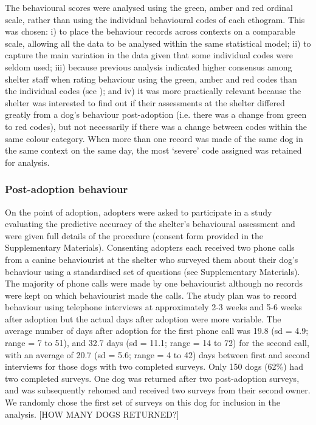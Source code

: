 \documentclass[12pt]{article}
\begin{document}
The behavioural scores were analysed using the green, amber and red ordinal scale, rather than using the individual behavioural codes of each ethogram. This was chosen: i) to place the behaviour records across contexts on a comparable scale, allowing all the data to be analysed within the same statistical model; ii) to capture the main variation in the data given that some individual codes were seldom used; iii) because previous analysis indicated higher consensus among shelter staff when rating behaviour using the green, amber and red codes than the individual codes (see \cite{goold2017modelling}); and iv) it was more practically relevant because the shelter was interested to find out if their assessments at the shelter differed greatly from a dog's behaviour post-adoption (i.e. there was a change from green to red codes), but not necessarily if there was a change between codes within the same colour category. When more than one record was made of the same dog in the same context on the same day, the most `severe' code assigned was retained for analysis.

\subsubsection{Post-adoption behaviour}
On the point of adoption, adopters were asked to participate in a study evaluating the predictive accuracy of the shelter's behavioural assessment and were given full details of the procedure (consent form provided in the Supplementary Materials). Consenting adopters each received two phone calls from a canine behaviourist at the shelter who surveyed them about their dog's behaviour using a standardised set of questions (see Supplementary Materials). The majority of phone calls were made by one behaviourist although no records were kept on which behaviourist made the calls. The study plan was to record behaviour using telephone interviews at approximately 2-3 weeks and 5-6 weeks after adoption but the actual days after adoption were more variable. The average number of days after adoption for the first phone call was 19.8 (sd = 4.9; range = 7 to 51), and 32.7 days (sd = 11.1; range = 14 to 72) for the second call, with an average of 20.7 (sd = 5.6; range = 4 to 42) days between first and second interviews for those dogs with two completed surveys. Only 150 dogs (62\%) had two completed surveys. One dog was returned after two post-adoption surveys, and was subsequently rehomed and received two surveys from their second owner. We randomly chose the first set of surveys on this dog for inclusion in the analysis. [HOW MANY DOGS RETURNED?]
\end{document}

